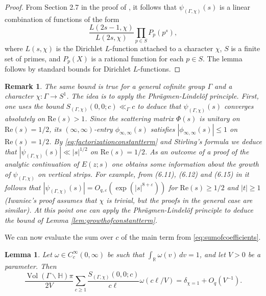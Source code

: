 \documentclass{article}
\newtheorem{lem}[thm]{Lemma}
\newtheorem{remark}[thm]{Remark}
\theoremstyle{named}
\newcommand{\Hyp}{\mathbb{H}}
\newcommand{\R}{\mathbb{R}}
\DeclareMathOperator{\vol}{Vol}
\begin{document}
\begin{proof}
From Section 2.7 in the proof of \cite[Theorem 1]{reznikoveisensteinmatrix}, it follows that $\psi_{(\Gamma, \chi)}(s)$ is a linear combination of functions of the form 
\begin{equation*}
    \frac{L(2s - 1, \chi)}{L(2s, \chi)} \prod_{p \in S}P_p(p^s) ,
\end{equation*}
where $L(s, \chi)$ is the Dirichlet $L$-function attached to a character $\chi$, $S$ is a finite set of primes, and $P_p(X)$ is a rational function for each $p \in S$. The lemma follows by standard bounds for Dirichlet $L$-functions.
\end{proof}
\begin{remark}
The same bound is true for a general cofinite group $\Gamma$ and a character $\chi: \Gamma \rightarrow S^1$. The idea is to apply the Phrägmen-Lindelöf principle. First, one uses the bound $S_{(\Gamma, \chi)}(0, 0; c) \ll_\Gamma c$ to deduce that $\psi_{(\Gamma, \chi)}(s)$ converges absolutely on $\text{Re}(s) > 1$. Since the scattering matrix $\Phi(s)$ is unitary on $\text{Re}(s) = 1/2$, its $(\infty, \infty)$-entry $\phi_{\infty, \infty}(s)$ satisfies $|\phi_{\infty, \infty}(s)| \leq 1$ on $\text{Re}(s) = 1/2$. By \eqref{eq:factorizationconstantterm} and Stirling's formula we deduce that $|\psi_{(\Gamma, \chi)}(s)| \ll |s|^{1/2}$ on $\text{Re}(s) = 1/2$. As an outcome of a proof of the analytic continuation of $E(z; s)$ one obtains some information about the growth of $\psi_{(\Gamma, \chi)}$ on vertical strips. For example, from (6.11), (6.12) and (6.15) in \cite[Proposition 6.1]{iwaniec} it follows that $|\psi_{(\Gamma, \chi)}(s)| = O_{q, \varepsilon}(\exp(|s|^{8 + \varepsilon}))$ for $\text{Re}(s) \geq 1/2$ and $|t| \geq 1$ (Iwaniec's proof assumes that $\chi$ is trivial, but the proofs in the general case are similar). At this point one can apply the Phrägmen-Lindelöf principle to deduce the bound of Lemma \ref{lem:growthofconstantterm}.
\end{remark}

We can now evaluate the sum over $c$ of the main term from \eqref{eq:sumofcoefficients}.
\begin{lem}\label{lem:zerothsumofkloostermansumevaluation}
Let $\omega \in C_c^\infty(0, \infty)$ be such that $\int_\R \omega(v)\, dv = 1$, and let $V > 0$ be a parameter. Then 
\begin{equation}\label{eq:zerothsumofkloostermansumevaluation}
    \frac{\vol(\Gamma\backslash \Hyp)\pi}{2V}\sum_{c \geq 1} \frac{S_{(\Gamma, \chi)}(0, 0; c)}{c\ell}\omega(c\ell/V) = \delta_{\chi = 1} + O_q(V^{-1}).
\end{equation}
\end{lem}
\end{document}

